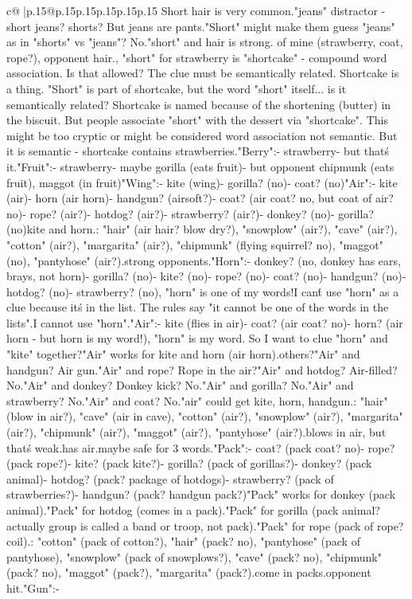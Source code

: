 \documentclass{article}
\begin{document}
{\begin{supertabular}{c@{$\;$}|p{.15\linewidth}@{}p{.15\linewidth}p{.15\linewidth}p{.15\linewidth}p{.15\linewidth}p{.15\linewidth}}
{{{Short hair is very common.\nAlso "jeans" distractor - short jeans? shorts? But jeans are pants.\n"Short" might make them guess "jeans" as in "shorts" vs "jeans"? No.\nBut "short" and hair is strong. of mine (strawberry, coat, rope?), opponent hair.\nActually, "short" for strawberry is "shortcake" - compound word association. Is that allowed? The clue must be semantically related. Shortcake is a thing. "Short" is part of shortcake, but the word "short" itself... is it semantically related? Shortcake is named because of the shortening (butter) in the biscuit. But people associate "short" with the dessert via "shortcake". This might be too cryptic or might be considered word association not semantic. But it is semantic - shortcake contains strawberries.\n\n"Berry":\n- strawberry\n- but that\'s it.\n\n"Fruit":\n- strawberry\n- maybe gorilla (eats fruit)\n- but opponent chipmunk (eats fruit), maggot (in fruit)\n\n"Wing":\n- kite (wing)\n- gorilla? (no)\n- coat? (no)\n\n"Air":\n- kite (air)\n- horn (air horn)\n- handgun? (airsoft?)\n- coat? (air coat? no, but coat of air? no)\n- rope? (air?)\n- hotdog? (air?)\n- strawberry? (air?)\n- donkey? (no)\n- gorilla? (no)\nSo kite and horn.\nOpponent: "hair" (air hair? blow dry?), "snowplow" (air?), "cave" (air?), "cotton" (air?), "margarita" (air?), "chipmunk" (flying squirrel? no), "maggot" (no), "pantyhose" (air?).\nNot strong opponents.\n\n"Horn":\n- donkey? (no, donkey has ears, brays, not horn)\n- gorilla? (no)\n- kite? (no)\n- rope? (no)\n- coat? (no)\n- handgun? (no)\n- hotdog? (no)\n- strawberry? (no)\nWait, "horn" is one of my words!\nSo I can\'t use "horn" as a clue because it\'s in the list. The rules say "it cannot be one of the words in the lists".\nSo I cannot use "horn".\n\n"Air":\n- kite (flies in air)\n- coat? (air coat? no)\n- horn? (air horn - but horn is my word!)\nWait, "horn" is my word. So I want to clue "horn" and "kite" together?\n"Air" works for kite and horn (air horn).\nAny others?\n"Air" and handgun? Air gun.\n"Air" and rope? Rope in the air?\n"Air" and hotdog? Air-filled? No.\n"Air" and donkey? Donkey kick? No.\n"Air" and gorilla? No.\n"Air" and strawberry? No.\n"Air" and coat? No.\nSo "air" could get kite, horn, handgun.\nOpponent: "hair" (blow in air?), "cave" (air in cave), "cotton" (air?), "snowplow" (air?), "margarita" (air?), "chipmunk" (air?), "maggot" (air?), "pantyhose" (air?).\nHair blows in air, but that\'s weak.\nCave has air.\nSo maybe safe for 3 words.\n\n"Pack":\n- coat? (pack coat? no)\n- rope? (pack rope?)\n- kite? (pack kite?)\n- gorilla? (pack of gorillas?)\n- donkey? (pack animal)\n- hotdog? (pack? package of hotdogs)\n- strawberry? (pack of strawberries?)\n- handgun? (pack? handgun pack?)\n"Pack" works for donkey (pack animal).\n"Pack" for hotdog (comes in a pack).\n"Pack" for gorilla (pack animal? actually group is called a band or troop, not pack).\n"Pack" for rope (pack of rope? coil).\nOpponent: "cotton" (pack of cotton?), "hair" (pack? no), "pantyhose" (pack of pantyhose), "snowplow" (pack of snowplows?), "cave" (pack? no), "chipmunk" (pack? no), "maggot" (pack?), "margarita" (pack?).\nPantyhose come in packs.\nSo opponent hit.\n\n"Gun":\n- }}}
\end{supertabular}}
\end{document}
